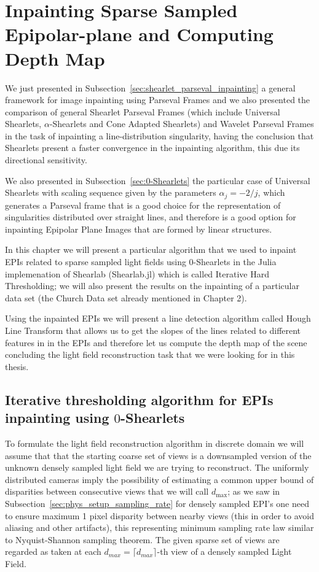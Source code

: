 \chapter{Inpainting Sparse Sampled Epipolar-plane and Computing Depth Map}
\label{chap:Inpainting_sparse}

We just presented in Subsection~\ref{sec:shearlet_parseval_inpainting} a general framework for image inpainting using Parseval Frames and we also presented the comparison of general Shearlet Parseval Frames (which include Universal Shearlets, $\alpha$-Shearlets and Cone Adapted Shearlets) and Wavelet Parseval Frames in the task of inpainting a line-distribution singularity, having the conclusion that Shearlets present a faster convergence in the inpainting algorithm, this due its directional sensitivity.

\bigskip

We also presented in Subsection~\ref{sec:0-Shearlets} the particular case of Universal Shearlets with scaling sequence given by the parameters $\alpha_j=-2/j$, which generates a Parseval frame that is a good choice for the representation of singularities distributed over straight lines, and therefore is a good option for inpainting Epipolar Plane Images that are formed by linear structures.

\bigskip

In this chapter we will present a particular algorithm that we used to inpaint EPIs related to sparse sampled light fields using $0$-Shearlets in the Julia implemenation of Shearlab (Shearlab.jl) which is called Iterative Hard Thresholding; we will also present the results on the inpainting of a particular data set (the Church Data set already mentioned in Chapter 2). 

\bigskip

Using the inpainted EPIs we will present a line detection algorithm called Hough Line Transform that allows us to get the slopes of the lines related to different features in in the EPIs and therefore let us compute the depth map of the scene concluding the light field reconstruction task that we were looking for in this thesis. 

\section{Iterative thresholding algorithm for EPIs inpainting using $0$-Shearlets}

To formulate the light field reconstruction algorithm in discrete domain we will assume that that the starting coarse set of views is a downsampled version of the unknown densely sampled light field we are trying to reconstruct. The uniformly distributed cameras imply the possibility of estimating a common upper bound of disparities between consecutive views that we will call $d_{\text{max}}$; as we saw in Subsection~\ref{sec:phys_setup_sampling_rate} for densely sampled EPI's one need to ensure maximum 1 pixel disparity between nearby views (this in order to avoid aliasing and other artifacts), this representing minimum sampling rate law similar to Nyquist-Shannon sampling theorem. The given sparse set of views are regarded as taken at each $d_{max}=\lceil d_{max}\rceil$-th view of a densely sampled Light Field. 

